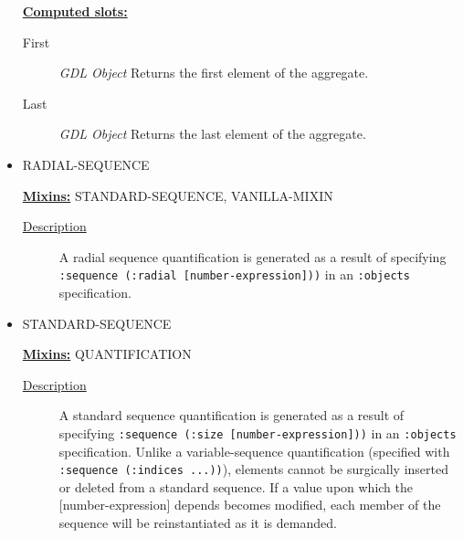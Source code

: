 \documentclass [11pt]{book}
\begin{document}
\begin{itemize}
\begin{description}
\end{description}








\textbf{
\underline{Computed slots:}}

\begin{description}

\item [First]
\emph{GDL Object} Returns the first element of the aggregate.


\item [Last]
\emph{GDL Object} Returns the last element of the aggregate.


\end{description}







\item {}RADIAL-SEQUENCE


\textbf{
\underline{Mixins:}} STANDARD-SEQUENCE, VANILLA-MIXIN





\begin{description}

\item [
\underline{Description}]


A radial sequence quantification is generated as a result of specifying 
\texttt{:sequence (:radial [number-expression]))} in an \texttt{:objects} specification.



\end{description}









\item {}STANDARD-SEQUENCE


\textbf{
\underline{Mixins:}} QUANTIFICATION





\begin{description}

\item [
\underline{Description}]


A standard sequence quantification is generated as a result of specifying 
\texttt{:sequence (:size [number-expression]))} in an \texttt{:objects} specification. Unlike a variable-sequence 
quantification (specified with \texttt{:sequence (:indices ...))}), elements cannot be surgically inserted or 
deleted from a standard sequence. If a value upon which the [number-expression] depends becomes modified,
each member of the sequence will be reinstantiated as it is demanded.




\end{description}
\end{itemize}
\end{document}
